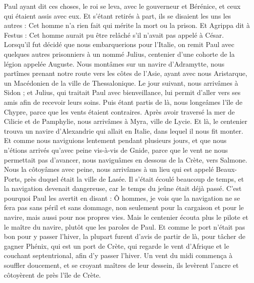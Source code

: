 \begin{multicols}{2}
Paul ayant dit ces choses, le roi se leva, avec le gouverneur et Bérénice, et ceux qui étaient assis avec eux.
Et s'étant retirés à part, ils se disaient les uns les autres : Cet homme n'a rien fait qui mérite la mort ou la prison.
Et Agrippa dit à Festus : Cet homme aurait pu être relâché s'il n'avait pas appelé à César.
\VerseOne{}Lorsqu'il fut décidé que nous embarquerions pour l'Italie, on remit Paul avec quelques autres prisonniers à un nommé Julius, centenier d'une cohorte de la légion appelée Auguste.
Nous montâmes sur un navire d'Adramytte, nous partîmes prenant notre route vers les côtes de l'Asie, ayant avec nous Aristarque, un Macédonien de la ville de Thessalonique.
Le jour suivant, nous arrivâmes à Sidon ; et Julius, qui traitait Paul avec bienveillance, lui permit d'aller vers ses amis afin de recevoir leurs soins.
Puis étant partis de là, nous longeâmes l'île de Chypre, parce que les vents étaient contraires.
Après avoir traversé la mer de Cilicie et de Pamphylie, nous arrivâmes à Myra, ville de Lycie.
Et là, le centenier trouva un navire d'Alexandrie qui allait en Italie, dans lequel il nous fit monter.
Et comme nous naviguions lentement pendant plusieurs jours, et que nous n'étions arrivés qu'avec peine vis-à-vis de Gnide, parce que le vent ne nous permettait pas d'avancer, nous naviguâmes en dessous de la Crète, vers Salmone.
Nous la côtoyâmes avec peine, nous arrivâmes à un lieu qui est appelé Beaux-Ports, près duquel était la ville de Lasée.
Il s'était écoulé beaucoup de temps, et la navigation devenait dangereuse, car le temps du jeûne était déjà passé.
C'est pourquoi Paul les avertit en disant : Ô hommes, je vois que la navigation ne se fera pas sans péril et sans dommage, non seulement pour la cargaison et pour le navire, mais aussi pour nos propres vies.
Mais le centenier écouta plus le pilote et le maître du navire, plutôt que les paroles de Paul.
Et comme le port n'était pas bon pour y passer l'hiver, la plupart furent d'avis de partir de là, pour tâcher de gagner Phénix, qui est un port de Crète, qui regarde le vent d'Afrique et le couchant septentrional, afin d'y passer l'hiver.
Un vent du midi commença à souffler doucement, et se croyant maîtres de leur dessein, ils levèrent l'ancre et côtoyèrent de près l'île de Crète.

\end{multicols}
